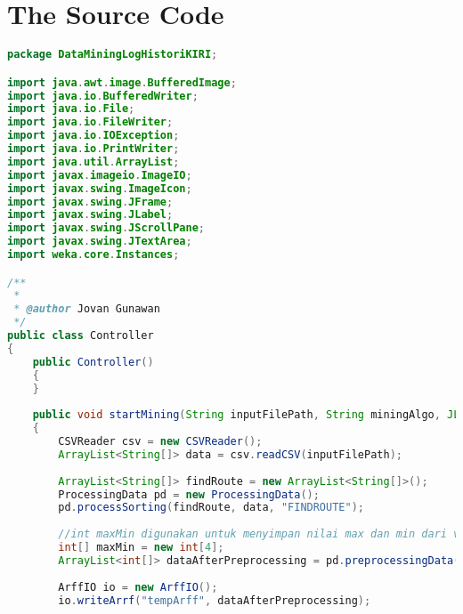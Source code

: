 \chapter{The Source Code}
\label{app:B}

\singlespacing 
%
%
\begin{lstlisting}[language=Java,basicstyle=\tiny,caption=Controller.java]
package DataMiningLogHistoriKIRI;

import java.awt.image.BufferedImage;
import java.io.BufferedWriter;
import java.io.File;
import java.io.FileWriter;
import java.io.IOException;
import java.io.PrintWriter;
import java.util.ArrayList;
import javax.imageio.ImageIO;
import javax.swing.ImageIcon;
import javax.swing.JFrame;
import javax.swing.JLabel;
import javax.swing.JScrollPane;
import javax.swing.JTextArea;
import weka.core.Instances;

/**
 *
 * @author Jovan Gunawan
 */
public class Controller
{
    public Controller()
    {
    }
    
    public void startMining(String inputFilePath, String miningAlgo, JLabel label, JTextArea textArea) throws IOException
    {
        CSVReader csv = new CSVReader();
        ArrayList<String[]> data = csv.readCSV(inputFilePath);
        
        ArrayList<String[]> findRoute = new ArrayList<String[]>();
        ProcessingData pd = new ProcessingData();
        pd.processSorting(findRoute, data, "FINDROUTE");
        
        //int maxMin digunakan untuk menyimpan nilai max dan min dari variable bulan dan tahun. Untuk ketentuan posisi array dapat dilihat di method preprocessing data
        int[] maxMin = new int[4];
        ArrayList<int[]> dataAfterPreprocessing = pd.preprocessingData(findRoute, maxMin);
        
        ArffIO io = new ArffIO();
        io.writeArrf("tempArff", dataAfterPreprocessing);
        

\end{lstlisting}
